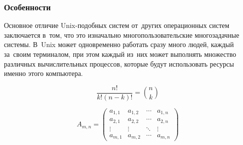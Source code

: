 \documentclass{bmstu}
\begin{document}
\subsubsection{Особенности}

Основное отличие Unix-подобных систем от~других операционных систем заключается в~том, что это изначально многопользовательские многозадачные системы.
В~Unix может одновременно работать сразу много людей, каждый за~своим терминалом, при этом каждый из~них может выполнять множество различных вычислительных процессов, которые будут использовать ресурсы именно этого компьютера. \newpage


\begin{equation}\label{equ:matrix}
	\frac{n!}{k!(n-k)!} = \binom{n}{k}
\end{equation}

\begin{equation*}
	A_{m,n} =
	\begin{pmatrix}
		a_{1,1} & a_{1,2} & \cdots & a_{1,n} \\
		a_{2,1} & a_{2,2} & \cdots & a_{2,n} \\
		\vdots  & \vdots  & \ddots & \vdots  \\
		a_{m,1} & a_{m,2} & \cdots & a_{m,n}
	\end{pmatrix}
\end{equation*}
\end{document}
